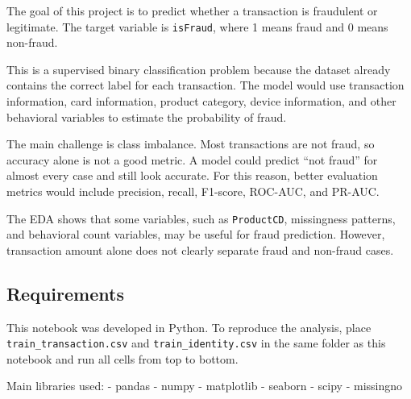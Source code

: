\documentclass[11pt]{article}
\begin{document}
    The goal of this project is to predict whether a transaction is
fraudulent or legitimate. The target variable is \texttt{isFraud}, where
1 means fraud and 0 means non-fraud.

This is a supervised binary classification problem because the dataset
already contains the correct label for each transaction. The model would
use transaction information, card information, product category, device
information, and other behavioral variables to estimate the probability
of fraud.

The main challenge is class imbalance. Most transactions are not fraud,
so accuracy alone is not a good metric. A model could predict ``not
fraud'' for almost every case and still look accurate. For this reason,
better evaluation metrics would include precision, recall, F1-score,
ROC-AUC, and PR-AUC.

The EDA shows that some variables, such as \texttt{ProductCD},
missingness patterns, and behavioral count variables, may be useful for
fraud prediction. However, transaction amount alone does not clearly
separate fraud and non-fraud cases.

    \subsection{Requirements}\label{requirements}

    This notebook was developed in Python. To reproduce the analysis, place
\texttt{train\_transaction.csv} and \texttt{train\_identity.csv} in the
same folder as this notebook and run all cells from top to bottom.

Main libraries used: - pandas - numpy - matplotlib - seaborn - scipy -
missingno
\end{document}
